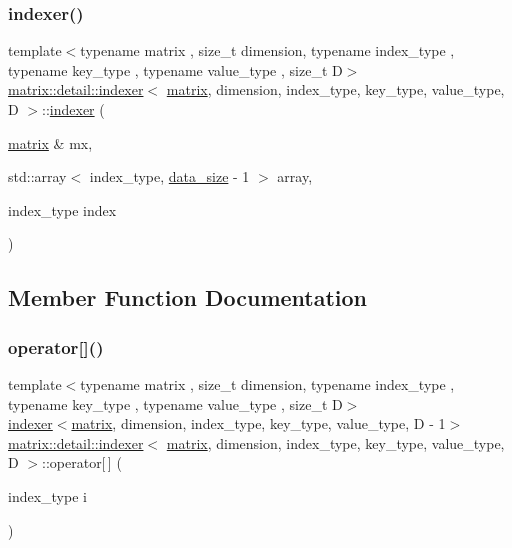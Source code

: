 \subsubsection{\texorpdfstring{indexer()}{indexer()}}
{\footnotesize\ttfamily template$<$typename matrix , size\+\_\+t dimension, typename index\+\_\+type , typename key\+\_\+type , typename value\+\_\+type , size\+\_\+t D$>$ \\
\hyperlink{structmatrix_1_1detail_1_1indexer}{matrix\+::detail\+::indexer}$<$ \hyperlink{structmatrix_1_1matrix}{matrix}, dimension, index\+\_\+type, key\+\_\+type, value\+\_\+type, D $>$\+::\hyperlink{structmatrix_1_1detail_1_1indexer}{indexer} (\begin{DoxyParamCaption}\item[{\hyperlink{structmatrix_1_1matrix}{matrix} \&}]{mx,  }\item[{std\+::array$<$ index\+\_\+type, \hyperlink{structmatrix_1_1detail_1_1indexer_ad253e4bd5e3639bcf8fdf64a94e796b1}{data\+\_\+size} -\/ 1 $>$}]{array,  }\item[{index\+\_\+type}]{index }\end{DoxyParamCaption})\hspace{0.3cm}{\ttfamily [inline]}}



\subsection{Member Function Documentation}
\mbox{\label{structmatrix_1_1detail_1_1indexer_aa1fc587fbe311991cdd03613c0acf57a}} 
\subsubsection{\texorpdfstring{operator[]()}{operator[]()}}
{\footnotesize\ttfamily template$<$typename matrix , size\+\_\+t dimension, typename index\+\_\+type , typename key\+\_\+type , typename value\+\_\+type , size\+\_\+t D$>$ \\
\hyperlink{structmatrix_1_1detail_1_1indexer}{indexer}$<$\hyperlink{structmatrix_1_1matrix}{matrix}, dimension, index\+\_\+type, key\+\_\+type, value\+\_\+type, D -\/ 1$>$ \hyperlink{structmatrix_1_1detail_1_1indexer}{matrix\+::detail\+::indexer}$<$ \hyperlink{structmatrix_1_1matrix}{matrix}, dimension, index\+\_\+type, key\+\_\+type, value\+\_\+type, D $>$\+::operator\mbox{[}$\,$\mbox{]} (\begin{DoxyParamCaption}\item[{index\+\_\+type}]{i }\end{DoxyParamCaption})\hspace{0.3cm}{\ttfamily [inline]}}




